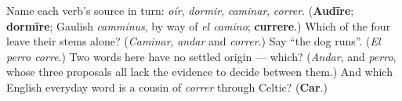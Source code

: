 \begin{tcolorbox}[breakable,colback=teal!4,colframe=teal!35!black,title={Before you move on}]
Name each verb's source in turn: \emph{oír}, \emph{dormir}, \emph{caminar}, \emph{correr}. (\textbf{Audīre}; \textbf{dormīre}; Gaulish \emph{camminus}, by way of \emph{el camino}; \textbf{currere}.) Which of the four leave their stems alone? (\emph{Caminar}, \emph{andar} and \emph{correr}.) Say \textquotedblleft{}the dog runs\textquotedblright{}. (\emph{El perro corre}.) Two words here have no settled origin — which? (\emph{Andar}, and \emph{perro}, whose three proposals all lack the evidence to decide between them.) And which English everyday word is a cousin of \emph{correr} through Celtic? (\textbf{Car}.)
\end{tcolorbox}
